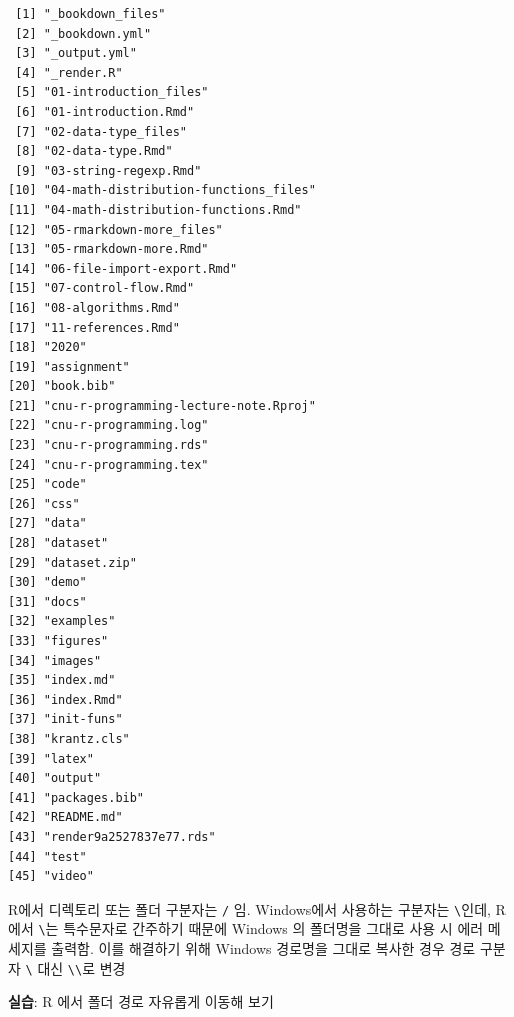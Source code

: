 \documentclass[
  11pt,
]{krantz}
\makeatletter
\newenvironment{kframe}{%
\medskip{}
\setlength{\fboxsep}{.8em}
 \def\at@end@of@kframe{}%
 \ifinner\ifhmode%
  \def\at@end@of@kframe{\end{minipage}}%
  \begin{minipage}{\columnwidth}%
 \fi\fi%
 \def\FrameCommand##1{\hskip\@totalleftmargin \hskip-\fboxsep
 \colorbox{shadecolor}{##1}\hskip-\fboxsep
     \hskip-\linewidth \hskip-\@totalleftmargin \hskip\columnwidth}%
 \MakeFramed {\advance\hsize-\width
   \@totalleftmargin\z@ \linewidth\hsize
   \@setminipage}}%
 {\par\unskip\endMakeFramed%
 \at@end@of@kframe}
\newenvironment{rmdblock}[1]
  {
  \begin{itemize}
  \renewcommand{\labelitemi}{
    \raisebox{-.7\height}[0pt][0pt]{
      {\setkeys{Gin}{width=3em,keepaspectratio}\texttt{[image: images/\#1]}}
    }
  }
  \setlength{\fboxsep}{1em}
  \begin{kframe}
  \item
  }
  {
  \end{kframe}
  \end{itemize}
  }
\newenvironment{rmdcaution}
  {\begin{rmdblock}{caution}}
  {\end{rmdblock}}
\makeatother
\begin{document}
\begin{verbatim}
 [1] "_bookdown_files"                     
 [2] "_bookdown.yml"                       
 [3] "_output.yml"                         
 [4] "_render.R"                           
 [5] "01-introduction_files"               
 [6] "01-introduction.Rmd"                 
 [7] "02-data-type_files"                  
 [8] "02-data-type.Rmd"                    
 [9] "03-string-regexp.Rmd"                
[10] "04-math-distribution-functions_files"
[11] "04-math-distribution-functions.Rmd"  
[12] "05-rmarkdown-more_files"             
[13] "05-rmarkdown-more.Rmd"               
[14] "06-file-import-export.Rmd"           
[15] "07-control-flow.Rmd"                 
[16] "08-algorithms.Rmd"                   
[17] "11-references.Rmd"                   
[18] "2020"                                
[19] "assignment"                          
[20] "book.bib"                            
[21] "cnu-r-programming-lecture-note.Rproj"
[22] "cnu-r-programming.log"               
[23] "cnu-r-programming.rds"               
[24] "cnu-r-programming.tex"               
[25] "code"                                
[26] "css"                                 
[27] "data"                                
[28] "dataset"                             
[29] "dataset.zip"                         
[30] "demo"                                
[31] "docs"                                
[32] "examples"                            
[33] "figures"                             
[34] "images"                              
[35] "index.md"                            
[36] "index.Rmd"                           
[37] "init-funs"                           
[38] "krantz.cls"                          
[39] "latex"                               
[40] "output"                              
[41] "packages.bib"                        
[42] "README.md"                           
[43] "render9a2527837e77.rds"              
[44] "test"                                
[45] "video"                               
\end{verbatim}

\normalsize

\footnotesize

\begin{rmdcaution}
R에서 디렉토리 또는 폴더 구분자는 \texttt{/} 임. Windows에서 사용하는 구분자는 \texttt{\textbackslash{}}인데, R에서 \texttt{\textbackslash{}}는 특수문자로 간주하기 때문에 Windows 의 폴더명을 그대로 사용 시 에러 메세지를 출력함. 이를 해결하기 위해 Windows 경로명을 그대로 복사한 경우 경로 구분자 \texttt{\textbackslash{}} 대신 \texttt{\textbackslash{}\textbackslash{}}로 변경

\textbf{실습}: R 에서 폴더 경로 자유롭게 이동해 보기
\end{rmdcaution}
\end{document}
